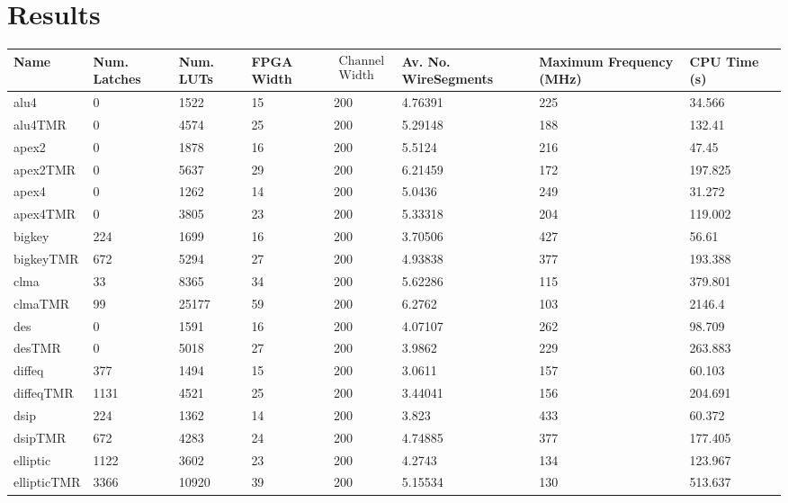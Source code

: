 \documentclass[12pt,final,oneside]{memoir} %
\begin{document}
\chapter{Results}
\begin{table}
\footnotesize
\begin{adjustwidth}{-1cm}{-1.2cm}
    \begin{tabularx}{1.1\textwidth}{XXXXlXXXX}
    \toprule
Name & Num. Latches & Num. LUTs & FPGA Width & $\begin{matrix}\text{Channel}\\\text{Width}\end{matrix}$ & Av. No. Wire\newline Segments & Maximum Frequency (MHz) & CPU Time (s)\\\midrule
alu4 & 0 & 1522 & 15 & 200 & 4.76391 &225 & 34.566\\
alu4TMR & 0 & 4574 & 25 & 200 & 5.29148 &188 & 132.41\\\midrule
apex2 & 0 & 1878 & 16 & 200 & 5.5124 &216 & 47.45\\
apex2TMR & 0 & 5637 & 29 & 200 & 6.21459 &172 & 197.825\\\midrule
apex4 & 0 & 1262 & 14 & 200 & 5.0436 &249 & 31.272\\
apex4TMR & 0 & 3805 & 23 & 200 & 5.33318 &204 & 119.002\\\midrule
bigkey & 224 & 1699 & 16 & 200 & 3.70506 &427 & 56.61\\
bigkeyTMR & 672 & 5294 & 27 & 200 & 4.93838 &377 & 193.388\\\midrule
clma & 33 & 8365 & 34 & 200 & 5.62286 &115 & 379.801\\
clmaTMR & 99 & 25177 & 59 & 200 & 6.2762 &103 & 2146.4\\\midrule
des & 0 & 1591 & 16 & 200 & 4.07107 &262 & 98.709\\
desTMR & 0 & 5018 & 27 & 200 & 3.9862 &229 & 263.883\\\midrule
diffeq & 377 & 1494 & 15 & 200 & 3.0611 &157 & 60.103\\
diffeqTMR & 1131 & 4521 & 25 & 200 & 3.44041 &156 & 204.691\\\midrule
dsip & 224 & 1362 & 14 & 200 & 3.823 &433 & 60.372\\
dsipTMR & 672 & 4283 & 24 & 200 & 4.74885 &377 & 177.405\\\midrule
elliptic & 1122 & 3602 & 23 & 200 & 4.2743 &134 & 123.967\\
ellipticTMR & 3366 & 10920 & 39 & 200 & 5.15534 &130 & 513.637\\\midrule

\end{tabularx}
\end{adjustwidth}
\end{table}
\end{document}
